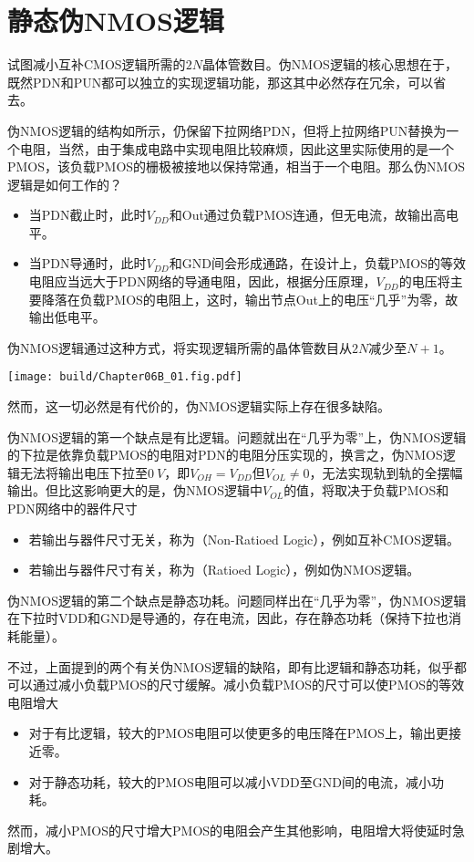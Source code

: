 \section{静态伪NMOS逻辑}
试图减小互补CMOS逻辑所需的$2N$晶体管数目。伪NMOS逻辑的核心思想在于，既然PDN和PUN都可以独立的实现逻辑功能，那这其中必然存在冗余，可以省去。

伪NMOS逻辑的结构如所示，仍保留下拉网络PDN，但将上拉网络PUN替换为一个电阻，当然，由于集成电路中实现电阻比较麻烦，因此这里实际使用的是一个PMOS，该负载PMOS的栅极被接地以保持常通，相当于一个电阻。那么伪NMOS逻辑是如何工作的？
\begin{itemize}
    \item 当PDN截止时，此时$V_{DD}$和Out通过负载PMOS连通，但无电流，故输出高电平。
    \item 当PDN导通时，此时$V_{DD}$和GND间会形成通路，在设计上，负载PMOS的等效电阻应当远大于PDN网络的导通电阻，因此，根据分压原理，$V_{DD}$的电压将主要降落在负载PMOS的电阻上，这时，输出节点Out上的电压“几乎”为零，故输出低电平。
\end{itemize}
伪NMOS逻辑通过这种方式，将实现逻辑所需的晶体管数目从$2N$减少至$N+1$。

\begin{Figure}[静态伪NMOS逻辑]
    \texttt{[image: build/Chapter06B\_01.fig.pdf]}
\end{Figure}

然而，这一切必然是有代价的，伪NMOS逻辑实际上存在很多缺陷。

伪NMOS逻辑的第一个缺点是有比逻辑。问题就出在“几乎为零”上，伪NMOS逻辑的下拉是依靠负载PMOS的电阻对PDN的电阻分压实现的，换言之，伪NMOS逻辑无法将输出电压下拉至$\SI{0}{V}$，即$V_{OH}=V_{DD}$但$V_{OL}\neq 0$，无法实现轨到轨的全摆幅输出。但比这影响更大的是，伪NMOS逻辑中$V_{OL}$的值，将取决于负载PMOS和PDN网络中的器件尺寸
\begin{itemize}
    \item 若输出与器件尺寸无关，称为（Non-Ratioed Logic），例如互补CMOS逻辑。
    \item 若输出与器件尺寸有关，称为（Ratioed Logic），例如伪NMOS逻辑。
\end{itemize}\goodbreak

伪NMOS逻辑的第二个缺点是静态功耗。问题同样出在“几乎为零”，伪NMOS逻辑在下拉时VDD和GND是导通的，存在电流，因此，存在静态功耗（保持下拉也消耗能量）。

不过，上面提到的两个有关伪NMOS逻辑的缺陷，即有比逻辑和静态功耗，似乎都可以通过减小负载PMOS的尺寸缓解。减小负载PMOS的尺寸可以使PMOS的等效电阻增大
\begin{itemize}
    \item 对于有比逻辑，较大的PMOS电阻可以使更多的电压降在PMOS上，输出更接近零。
    \item 对于静态功耗，较大的PMOS电阻可以减小VDD至GND间的电流，减小功耗。
\end{itemize}
然而，减小PMOS的尺寸增大PMOS的电阻会产生其他影响，电阻增大将使延时急剧增大。\goodbreak

